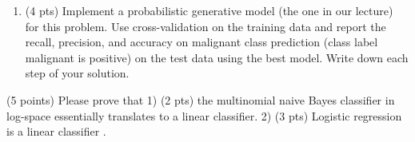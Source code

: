 \documentclass{exam}
\begin{document}
\begin{questions}
\begin{enumerate}
\item (4 pts) Implement a probabilistic generative model (the one in our lecture) for this problem. Use cross-validation on the training data and report the recall, precision, and accuracy on malignant class prediction (class label malignant is positive)  on the test data using the best model. Write down each step of your solution.
\end{enumerate}
\vspace{5em}


 (5 points) Please prove that 1) (2 pts) the multinomial naive Bayes classifier in log-space essentially translates to a linear classifier. 2) (3 pts) Logistic regression is a linear classifier .
\vspace{5em}




\end{questions}
\end{document}
